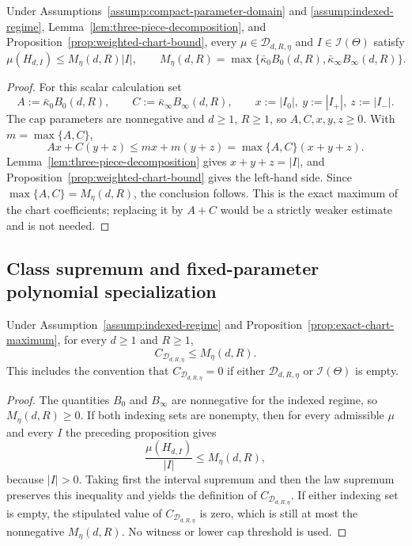 \begin{proposition}
\label{prop:exact-chart-maximum}
Under Assumptions~\ref{assump:compact-parameter-domain} and
\ref{assump:indexed-regime}, Lemma~\ref{lem:three-piece-decomposition}, and
Proposition~\ref{prop:weighted-chart-bound}, every
$\mu\in\mathcal D_{d,R,\eta}$ and $I\in\mathcal I(\Theta)$ satisfy
\[
\mu(H_{d,I})\leq M_\eta(d,R)|I|,
\qquad
M_\eta(d,R)=\max\{\bar\kappa_0B_0(d,R),
\bar\kappa_\infty B_\infty(d,R)\}.
\]
\end{proposition}

\begin{proof}
For this scalar calculation set
\[
A:=\bar\kappa_0B_0(d,R),\qquad
C:=\bar\kappa_\infty B_\infty(d,R),\qquad
x:=|I_0|,\ y:=|I_+|,\ z:=|I_-|.
\]
The cap parameters are nonnegative and $d\geq1$, $R\geq1$, so
$A,C,x,y,z\geq0$.  With $m=\max\{A,C\}$,
\[
Ax+C(y+z)\leq mx+m(y+z)=\max\{A,C\}(x+y+z).
\]
Lemma~\ref{lem:three-piece-decomposition} gives
$x+y+z=|I|$, and Proposition~\ref{prop:weighted-chart-bound} gives the
left-hand side.  Since $\max\{A,C\}=M_\eta(d,R)$, the conclusion follows.
This is the exact maximum of the chart coefficients; replacing it by $A+C$
would be a strictly weaker estimate and is not needed.
\end{proof}

\subsection{Class supremum and fixed-parameter polynomial specialization}
\label{app:class-and-rate}

\begin{proposition}
\label{prop:class-supremum}
Under Assumption~\ref{assump:indexed-regime} and
Proposition~\ref{prop:exact-chart-maximum}, for every $d\geq1$ and $R\geq1$,
\[
C_{\mathcal D_{d,R,\eta}}\leq M_\eta(d,R).
\]
This includes the convention that $C_{\mathcal D_{d,R,\eta}}=0$ if either
$\mathcal D_{d,R,\eta}$ or $\mathcal I(\Theta)$ is empty.
\end{proposition}

\begin{proof}
The quantities $B_0$ and $B_\infty$ are nonnegative for the indexed regime,
so $M_\eta(d,R)\geq0$.  If both indexing sets are nonempty, then for every
admissible $\mu$ and every $I$ the preceding proposition gives
\[
\frac{\mu(H_{d,I})}{|I|}\leq M_\eta(d,R),
\]
because $|I|>0$.  Taking first the interval supremum and then the law
supremum preserves this inequality and yields the definition of
$C_{\mathcal D_{d,R,\eta}}$.  If either indexing set is empty, the stipulated
value of $C_{\mathcal D_{d,R,\eta}}$ is zero, which is still at most the
nonnegative $M_\eta(d,R)$.  No witness or lower cap threshold is used.
\end{proof}

